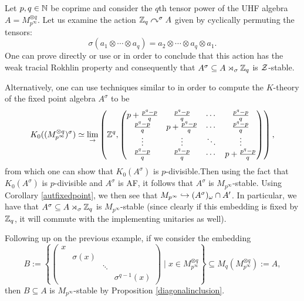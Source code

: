 \documentclass[12pt]{amsart}
\begin{document}
    \begin{example}
      Let $p,q \in \mathbb{N}$ be coprime and consider the $q$th tensor power of the UHF algebra $A = M_{p^{\infty}}^{\otimes q}$. Let us examine the action $\mathbb{Z}_q \curvearrowright^\sigma A$ given by cyclically permuting the tensors: 
\begin{equation}
      \sigma(a_1 \otimes \cdots \otimes a_q) = a_2 \otimes \cdots \otimes a_q \otimes a_1.
\end{equation}
      One can prove directly or use \cite{HirshbergOrovitz13} or \cite{AGJP22} in order to conclude that this action has the weak tracial Rokhlin property and consequently that $A^{\sigma} \subseteq A \rtimes_\sigma \mathbb{Z}_q$ is $\mathcal{Z}$-stable. 

      Alternatively, one can use techniques similar to \cite{HirshbergWinter07} in order to compute the $K$-theory of the fixed point algebra $A^{\sigma}$ to be 
\begin{equation}
      K_0((M_{p^{\infty}}^{\otimes q})^{\sigma}) \simeq \underset{\to}{\lim}\left(\mathbb{Z}^q,   \begin{pmatrix}
          p + \frac{p^q - p}{q} & \frac{p^q -p}{q} & \cdots & \frac{p^q - p}{q} \\
          \frac{p^q - p}{q} & p + \frac{p^q - p}{q} & \cdots & \frac{p^q - p}{q} \\
          \vdots & \vdots & \ddots & \vdots \\
          \frac{p^q - p}{q} & \frac{p^q - p}{q} & \cdots & p + \frac{p^q - p}{q}
      \end{pmatrix} \right), 
\end{equation}
      from which one can show that $K_0(A^{\sigma})$ is $p$-divisible.Then using the fact that $K_0(A^{\sigma})$ is $p$-divisible and $A^{\sigma}$ is AF, it follows that  $A^{\sigma}$ is  $M_{p^{\infty}}$-stable. Using Corollary \ref{autfixedpoint}, we then see that $M_{p^{\infty}} \hookrightarrow (A^{\sigma})_\omega \cap A'$. In particular, we have that $A^{\sigma} \subseteq A \rtimes_\sigma \mathbb{Z}_q$ is $M_{p^{\infty}}$-stable (since clearly if this embedding is fixed by $\mathbb{Z}_q$, it will commute with the implementing unitaries as well).  
    \end{example}

      \begin{example}
        Following up on the previous example, if we consider the embedding
\begin{equation}
        B := \left\{   \begin{pmatrix}
            x \\ & \sigma(x) \\ & & \ddots \\ & & & \sigma^{q-1}(x)
        \end{pmatrix} \mid x \in M_{p^{\infty}}^{\otimes q} \right\} \subseteq M_q(M_{p^{\infty}}^{\otimes q}) := A,
\end{equation}
        then $B \subseteq A$ is $M_{p^{\infty}}$-stable by Proposition \ref{diagonalinclusion}.
      \end{example}
\end{document}
